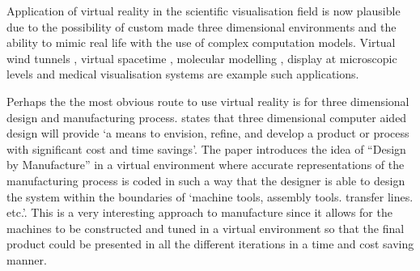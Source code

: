 Application of virtual reality in the scientific visualisation field is now plausible due to the possibility of custom made three dimensional environments and the ability to mimic real life with the use of complex computation models. Virtual wind tunnels \cite{bryson1992distributed, bryson1991virtual},  virtual spacetime \cite{bryson1992virtual}, molecular modelling \cite{brooks1990project}, display at microscopic levels \cite{taylor1993nanomanipulator} and medical visualisation systems \cite{bajura1992merging} are example such applications.

Perhaps the the most obvious route to use virtual reality is for three dimensional design and manufacturing process. \cite{jayaram1997virtual} states that three dimensional computer aided design will provide `a means to envision, refine, and develop a product or process with significant cost and time savings'. The paper introduces the idea of ``Design by Manufacture'' in a virtual environment where accurate representations of the manufacturing process is coded in such a way that the designer is able to design the system within the boundaries of `machine tools, assembly tools. transfer lines. etc.'. This is a very interesting approach to manufacture since it allows for the machines to be constructed and tuned in a virtual environment so that the final product could be presented in all the different iterations in a time and cost saving manner. 


